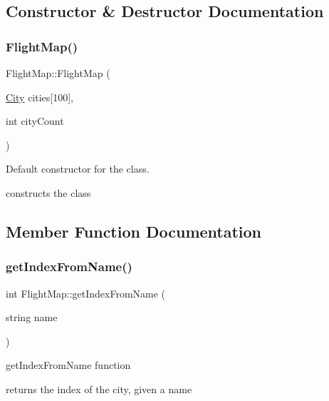 \subsection{Constructor \& Destructor Documentation}
\hypertarget{class_flight_map_abe6b8054568bad96d3ac09c498695306}{}\label{class_flight_map_abe6b8054568bad96d3ac09c498695306} 
\subsubsection{\texorpdfstring{Flight\+Map()}{FlightMap()}}
{\footnotesize\ttfamily Flight\+Map\+::\+Flight\+Map (\begin{DoxyParamCaption}\item[{\hyperlink{class_city}{City}}]{cities\mbox{[}100\mbox{]},  }\item[{int}]{city\+Count }\end{DoxyParamCaption})}



Default constructor for the class. 

constructs the class 

\subsection{Member Function Documentation}
\hypertarget{class_flight_map_ac74738eb68e8390c0e5fd87effb600e4}{}\label{class_flight_map_ac74738eb68e8390c0e5fd87effb600e4} 
\subsubsection{\texorpdfstring{get\+Index\+From\+Name()}{getIndexFromName()}}
{\footnotesize\ttfamily int Flight\+Map\+::get\+Index\+From\+Name (\begin{DoxyParamCaption}\item[{string}]{name }\end{DoxyParamCaption})}



get\+Index\+From\+Name function 

returns the index of the city, given a name \hypertarget{class_flight_map_a1bec9c3bddeadfeb909a457a574b5326}{}\label{class_flight_map_a1bec9c3bddeadfeb909a457a574b5326} 
